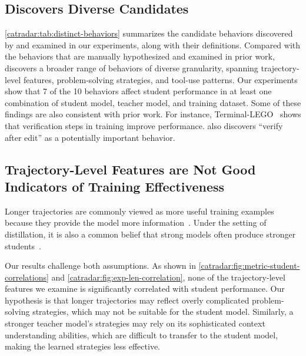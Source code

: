 \subsection{\toolName Discovers Diverse Candidates}
\label{catradar:sec:distinct-behaviors}
\autoref{catradar:tab:distinct-behaviors} summarizes the candidate behaviors discovered by \toolName and examined in our experiments, along with their definitions. Compared with the behaviors that are manually hypothesized and examined in prior work, \toolName discovers a broader range of behaviors of diverse granularity, spanning trajectory-level features, problem-solving strategies, and tool-use patterns.
Our experiments show that 7 of the 10 behaviors affect student performance in at least one combination of student model, teacher model, and training dataset. Some of these findings are also consistent with prior work. For instance, Terminal-LEGO~\citep{terminal-lego} shows that verification steps in training improve performance. \toolName also discovers ``verify after edit'' as a potentially important behavior.



\subsection{Trajectory-Level Features are Not Good Indicators of Training Effectiveness}
\label{catradar:sec:traj-features}
Longer trajectories are commonly viewed as more useful training examples because they provide the model more information~\citep{swe-play}.
Under the setting of distillation, it is also a common belief that strong models often produce stronger students~\citep{swegym}. 

Our results challenge both assumptions. As shown in \autoref{catradar:fig:metric-student-correlations} and \autoref{catradar:fig:exp-len-correlation}, none of the trajectory-level features we examine is significantly correlated with student performance. 
Our hypothesis is that longer trajectories may reflect overly complicated problem-solving strategies, which may not be suitable for the student model.
Similarly, a stronger teacher model's strategies may rely on its sophisticated context understanding abilities, which are difficult to transfer to the student model, making the learned strategies less effective.




